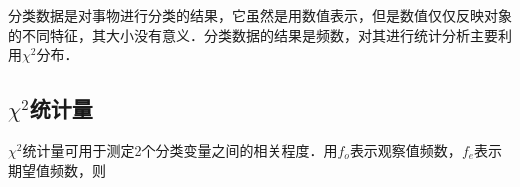 分类数据是对事物进行分类的结果，它虽然是用数值表示，但是数值仅仅反映对象的不同特征，其大小没有意义．分类数据的结果是频数，对其进行统计分析主要利用$\chi^2$分布．
\subsection{$\chi^2$统计量}
$\chi^2$统计量可用于测定2个分类变量之间的相关程度．用$f_o$表示观察值频数，$f_e$表示期望值频数，则